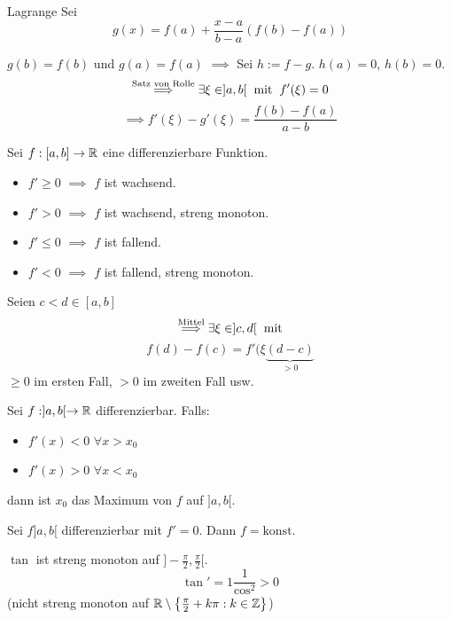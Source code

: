 \begin{Bew}{Lagrange}
  Sei
  \[g(x)=f(a)+\frac{x-a}{b-a}(f(b)-f(a))\]
\end{Bew}
\begin{Bem}
  $g(b)=f(b)$ und $g(a)=f(a)$ $\implies$ Sei $h:=f-g$. $h(a)=0$, $h(b)=0$. 
  \[\stackrel{\text{Satz von Rolle}}{\implies}\exists \xi\in ]a,b[\hspace{2mm}\text{mit}\hspace{2mm} f'(\xi)=0\]
  \[\implies f'(\xi)-g'(\xi)=\frac{f(b)-f(a)}{a-b}\]
\end{Bem}
\begin{Kor}
  Sei $f:[a,b]\to\mathbb{R}$ eine differenzierbare Funktion.
  \begin{itemize}
    \item $f'\geq 0$ $\implies$ $f$ ist wachsend.
    \item $f'> 0$ $\implies$ $f$ ist wachsend, streng monoton.
    \item $f'\leq 0$ $\implies$ $f$ ist fallend.
    \item $f'< 0$ $\implies$ $f$ ist fallend, streng monoton.
  \end{itemize}
\end{Kor}
\begin{Bew}
  Seien $c<d\in [a,b]$
  \[\stackrel{\text{Mittel}}{\implies}\exists \xi\in ]c,d[\hspace{2mm}\text{mit}\]
  \[f(d)-f(c)=f'(\xi\underbrace{(d-c)}_{>0}\]
  $\geq 0$ im ersten Fall, $>0$ im zweiten Fall usw.
\end{Bew}
\begin{Kor}
  Sei $f:]a,b[\to\mathbb{R}$ differenzierbar. Falls:
  \begin{itemize}
    \item $f'(x)<0$ $\forall x>x_0$
    \item $f'(x)>0$ $\forall x<x_0$
  \end{itemize}
  dann ist $x_0$ das Maximum von $f$ auf $]a,b[$.
\end{Kor}
\begin{Kor}
  Sei $f]a,b[$ differenzierbar mit $f'=0$. Dann $f=\text{konst}$.
\end{Kor}
\begin{Bsp}
  $\tan$ ist streng monoton auf $]-\frac{\pi}{2},\frac{\pi}{2}[$.
  \[\tan'=1\frac{1}{\cos^2}>0\]
  (nicht streng monoton auf $\mathbb{R}\setminus\left\{ \frac{\pi}{2}+k\pi:k\in\mathbb{Z} \right\}$)
\end{Bsp}
